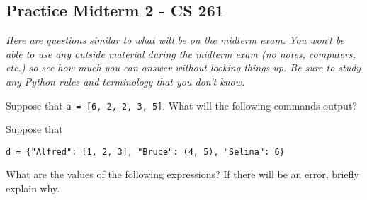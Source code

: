 \documentclass[12pt,answers]{exam}
\begin{document}
\pagestyle{empty}
\graphicspath{{/home/brian/Dropbox/HSC/Spring16/Math111/}}

\subsection*{Practice Midterm 2 - CS 261}
\textit{Here are questions similar to what will be on the midterm exam.  You won't be able to use any outside material during the midterm exam (no notes, computers, etc.) so see how much you can answer without looking things up. Be sure to study any Python rules and terminology that you don't know. }

\begin{questions}

\question Suppose that \verb|a = [6, 2, 2, 3, 5]|. What will the following commands output?  


\question Suppose that 
\begin{center}
\verb|d = {"Alfred": [1, 2, 3], "Bruce": (4, 5), "Selina": 6}|
\end{center}
What are the values of the following expressions? If there will be an error, briefly explain why.


\end{questions}
\end{document}

